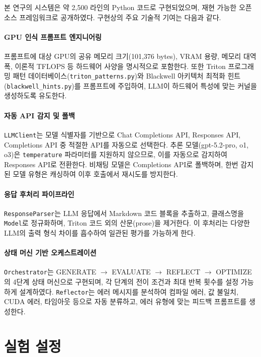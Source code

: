 \documentclass[sigplan,screen,review,anonymous]{acmart}
\begin{document}
본 연구의 시스템은 약 2,500 라인의 Python 코드로 구현되었으며, 재현 가능한 오픈소스 프레임워크로 공개하였다. 구현상의 주요 기술적 기여는 다음과 같다.

\paragraph{GPU 인식 프롬프트 엔지니어링}
프롬프트에 대상 GPU의 공유 메모리 크기(101,376 bytes), VRAM 용량, 메모리 대역폭, 이론적 TFLOPS 등 하드웨어 사양을 명시적으로 포함한다. 또한 Triton 프로그래밍 패턴 데이터베이스(\texttt{triton\_patterns.py})와 Blackwell 아키텍처 최적화 힌트(\texttt{blackwell\_hints.py})를 프롬프트에 주입하여, LLM이 하드웨어 특성에 맞는 커널을 생성하도록 유도한다.

\paragraph{자동 API 감지 및 폴백}
\texttt{LLMClient}는 모델 식별자를 기반으로 Chat Completions API, Responses API, Completions API 중 적절한 API를 자동으로 선택한다. 추론 모델(gpt-5.2-pro, o1, o3)은 \texttt{temperature} 파라미터를 지원하지 않으므로, 이를 자동으로 감지하여 Responses API로 전환한다. 비채팅 모델은 Completions API로 폴백하며, 한번 감지된 모델 유형은 캐싱하여 이후 호출에서 재시도를 방지한다.

\paragraph{응답 후처리 파이프라인}
\texttt{ResponseParser}는 LLM 응답에서 Markdown 코드 블록을 추출하고, 클래스명을 \texttt{Model}로 정규화하며, Triton 코드 외의 산문(prose)을 제거한다. 이 후처리는 다양한 LLM의 출력 형식 차이를 흡수하여 일관된 평가를 가능하게 한다.

\paragraph{상태 머신 기반 오케스트레이션}
\texttt{Orchestrator}는 GENERATE $\to$ EVALUATE $\to$ REFLECT $\to$ OPTIMIZE의 4단계 상태 머신으로 구현되며, 각 단계의 전이 조건과 최대 반복 횟수를 설정 가능하게 설계하였다. \texttt{Reflector}는 에러 메시지를 분석하여 컴파일 에러, 값 불일치, CUDA 에러, 타임아웃 등으로 자동 분류하고, 에러 유형에 맞는 피드백 프롬프트를 생성한다.


\section{실험 설정}
\label{sec:experimental_setup}
\end{document}
